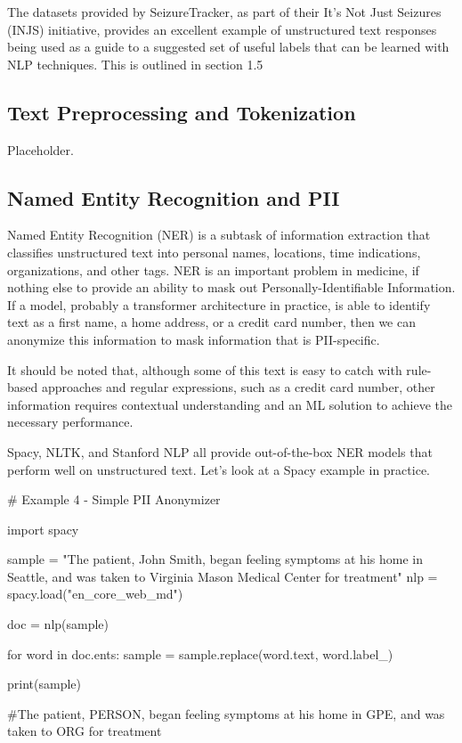 The datasets provided by SeizureTracker, as part of their It's Not Just Seizures (INJS) initiative, provides an excellent example of unstructured text responses being
used as a guide to a suggested set of useful labels that can be learned with NLP techniques. This is outlined in section 1.5
\subsection{Text Preprocessing and Tokenization}

Placeholder.

\subsection{Named Entity Recognition and PII}

Named Entity Recognition (NER) is a subtask of information extraction that classifies unstructured text into personal names, locations, time indications, organizations, and other tags.
NER is an important problem in medicine, if nothing else to provide an ability to mask out Personally-Identifiable Information.
If a model, probably a transformer architecture in practice, is able to identify text as a first name, a home address, or a credit card number, then we can anonymize this information to mask information that is PII-specific.

It should be noted that, although some of this text is easy to catch with rule-based approaches and regular expressions, such as a credit card number, other information requires contextual understanding and an ML solution
to achieve the necessary performance.

Spacy, NLTK, and Stanford NLP all provide out-of-the-box NER models that perform well on unstructured text. Let's look at a Spacy example in practice.

\begin{python}
  # Example 4 - Simple PII Anonymizer

  import spacy

  sample = "The patient, John Smith, began feeling symptoms at his home in Seattle, and was taken to Virginia Mason Medical Center for treatment"
  nlp = spacy.load("en_core_web_md")

  doc = nlp(sample)

  for word in doc.ents:
      sample = sample.replace(word.text, word.label_)

  print(sample)

  #The patient, PERSON, began feeling symptoms at his home in GPE, and was taken to ORG for treatment

\end{python}

